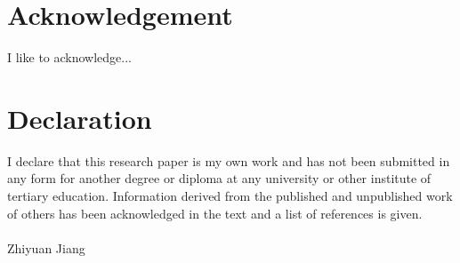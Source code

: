\chapter*{Acknowledgement}
I like to acknowledge...

\chapter*{Declaration}
I declare that this research paper is my own work and has not been submitted in any form for another degree or diploma at any university or other institute of tertiary education. Information derived from the published and unpublished work of others has been acknowledged in the text and a list of references is given.\\
\vspace{0.7cm}\\
Zhiyuan Jiang

